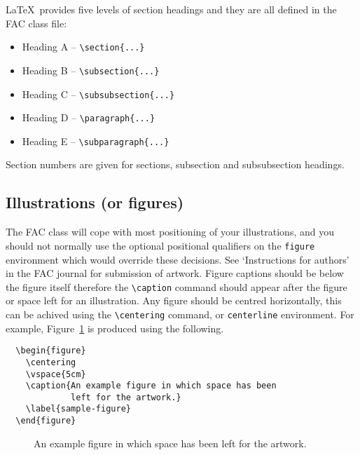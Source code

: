 \documentclass{fac}
\begin{document}
\LaTeX\ provides five levels of section headings and they are all
defined in the FAC class file:
%
\begin{itemize}
  \item[] Heading A -- \verb"\section{...}"
  \item[] Heading B -- \verb"\subsection{...}"
  \item[] Heading C -- \verb"\subsubsection{...}"
  \item[] Heading D -- \verb"\paragraph{...}"
  \item[] Heading E -- \verb"\subparagraph{...}"
\end{itemize}
%
Section numbers are given for sections, subsection and subsubsection
headings.

\subsection{Illustrations (or figures)}

The FAC class will cope with most positioning of your illustrations, and you
should not normally use the optional positional qualifiers on the
\verb"figure" environment which would override these decisions.
See `Instructions for authors' in the FAC journal for submission of artwork.
Figure captions should be below the figure itself therefore the \verb"\caption"
command should appear after the figure or space left for an illustration.
Any figure should be centred horizontally, this can be achived using the
\verb"\centering" command, or \verb"centerline" environment.
For example, Figure~\ref{sample-figure} is produced using the following.
%
\begin{verbatim}
  \begin{figure}
    \centering
    \vspace{5cm}
    \caption{An example figure in which space has been
             left for the artwork.}
    \label{sample-figure}
  \end{figure}
\end{verbatim}
%
\begin{figure}
  \centering
  \vspace{5cm}
  \caption{An example figure in which space has been
           left for the artwork.}
  \label{sample-figure}
\end{figure}
\end{document}
